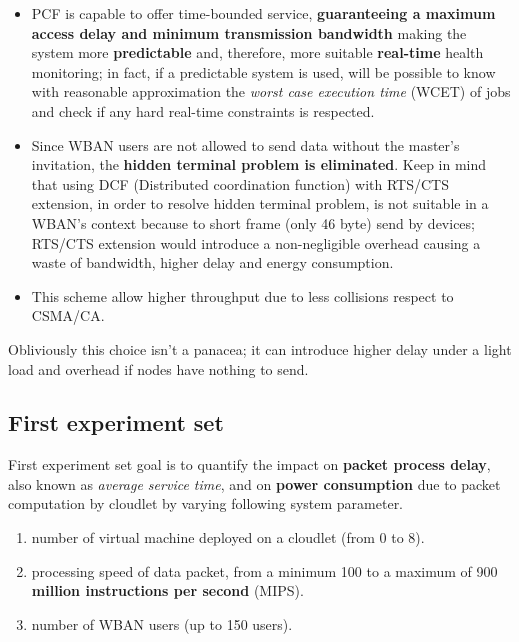 \documentclass[sigchi]{acmart}
\begin{document}
\begin{itemize}

\item PCF is capable to offer time-bounded service, \textbf{guaranteeing a maximum access delay and minimum transmission bandwidth} making the system more \textbf{predictable} and, therefore, more suitable \textbf{real-time} health monitoring; in fact, if a predictable system is used, will be possible to know with reasonable approximation the \textit{worst case execution time} (WCET) of jobs and check if any hard real-time constraints is respected.

\item Since WBAN users are not allowed to send data without the master's invitation, the \textbf{hidden terminal problem is eliminated}. Keep in mind that using DCF (Distributed coordination function) with RTS/CTS extension, in order to resolve hidden terminal problem, is not suitable in a WBAN's context because to short frame (only 46 byte) send by devices; RTS/CTS extension would introduce a non-negligible overhead causing a waste of bandwidth, higher delay and energy consumption.

\item This scheme allow higher throughput due to less collisions respect to CSMA/CA.

\end{itemize}

Obliviously this choice isn't a panacea; it can introduce higher delay under a light load and overhead if nodes have nothing to send.

\subsection{First experiment set}

First experiment set goal is to quantify the impact on \textbf{packet process delay}, also known as \textit{average service time}, and on \textbf{power consumption} due to packet computation by cloudlet by varying following system parameter.

\begin{enumerate}
\item number of virtual machine deployed on a cloudlet (from 0 to 8).
\item processing speed of data packet, from a minimum 100 to a maximum of 900 \textbf{million instructions per second} (MIPS).
\item number of WBAN users (up to 150 users).
\end{enumerate}
\end{document}
